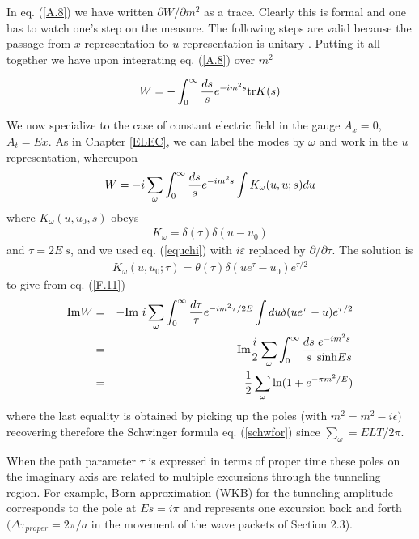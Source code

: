 \documentclass[12pt,oneside]{report}
\def\om{\omega	}
\begin{document}
 
In eq. (\ref{A.8}) we have written $ \partial W/ \partial m^2 $ as a trace.
Clearly this is formal and one has to watch one's step on the
measure. The following steps are valid because the passage from $
x$ representation to $u$ representation is unitary \cite{PaBr0}.
Putting it all together we have upon integrating eq. (\ref{A.8}) 
over $
m^2$ 

\begin{eqnarray}
W = -  \int _{0} ^{\infty} {ds \over s } e^{-im^2 s}  {\rm tr}
K{(s)} \label {F.11} 
\end{eqnarray} 

We now specialize to the case of constant electric field in the
gauge $ A_x = 0 $, $ A_t =  E x $. As in Chapter \ref{ELEC},
we can label the modes by $
\omega$ and work in the $u$ representation, whereupon
\begin{eqnarray}
W = - {i} \sum_\omega \int _{0}^{\infty}{ds \over s } e^{-im^2 s} \int
K_\omega (u, u; s) du \label {F.12}
\end{eqnarray}
where $ K_\omega (u,u_0, s)$ obeys
\begin{eqnarray}
[ u \partial_u + {1 \over 2} - \partial_\tau] K_\om = \delta(\tau)
\delta(u - u_0) \label {F.13} 
\end{eqnarray}
and $ \tau = 2E\ s $, and we used eq. (\ref{equchi})
 with $i \varepsilon $
replaced by $ \partial/\partial \tau.$
The solution is
\begin{eqnarray}
K_\om(u, u_0; \tau) = \theta (\tau) \delta (u e^{\tau} - u_0)
e^{\tau /2} \label {F.14}
\end{eqnarray}
to give from eq. (\ref{F.11}) 
\begin{eqnarray}
{\rm Im}W & = & - {\rm Im}\ {i}\sum_ \omega \int_{0} ^{\infty} {d \tau \over \tau}
e^{-im^2 \tau/2E} \int du  \delta (u e^ {\tau} - u) e^{\tau/2}
\nonumber \\ 
& = & - {\rm Im}{i\over 2 }\sum _\omega \int _{0} ^{\infty} {ds \over s }
{e^{-im^2 s} \over \mbox {sinh}Es} 
\nonumber \\
& = &{1\over 2} \sum _\omega \mbox{ln} (1 + e^{-\pi m^2/E}) \label {F.15}
\end{eqnarray}
where the last equality is obtained by picking 
up the poles (with $ m^2 = m^2-i\epsilon)$
recovering therefore
the Schwinger formula eq. (\ref {schwfor})
since $\sum_ \omega = ELT/2 \pi $.

When the path parameter $ \tau $ is expressed in terms
of proper time these poles on the imaginary axis are related to
multiple excursions through the tunneling region. For example, Born
approximation (WKB) for the tunneling amplitude corresponds
to the pole at $  Es = i \pi $ and represents one excursion back
and forth $ (\Delta \tau_{proper} = 2 \pi /a $ in the movement of
the wave packets of Section 2.3).
\end{document}
